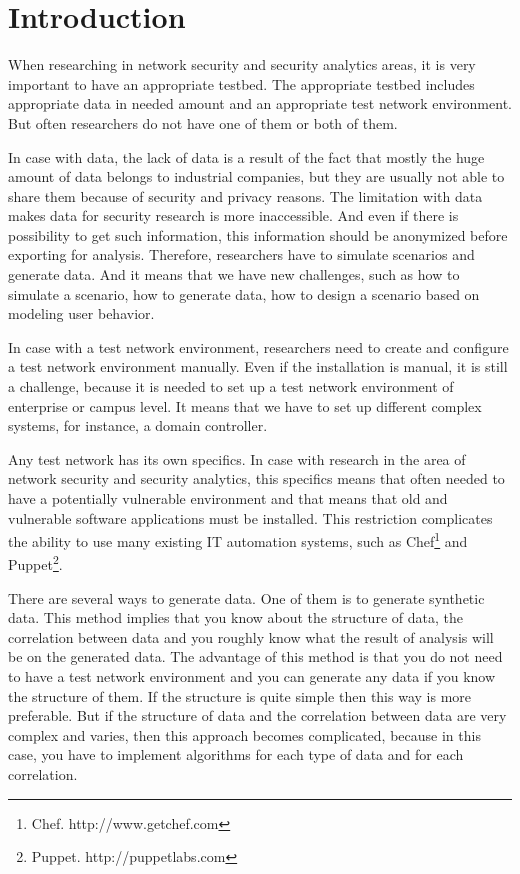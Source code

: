 \section{Introduction}


When researching in network security and security analytics areas, it is very important to have an appropriate testbed. The appropriate testbed includes appropriate data in needed amount and an appropriate test network environment. But often researchers do not have one of them or both of them.  

In case with data, the lack of data is a result of the fact that mostly the huge amount of data belongs to industrial companies, but they are usually not able to share them because of security and privacy reasons. The limitation with data makes data for security research is more inaccessible. And even if there is possibility to get such information, this information should be anonymized before exporting for analysis. Therefore, researchers have to simulate scenarios and generate data. And it means that we have new challenges, such as how to simulate a scenario, how to generate data, how to design a scenario based on modeling user behavior. 

In case with a test network environment, researchers need to create and configure a test network environment manually. Even if the installation is manual, it is still a challenge, because it is needed to set up a test network environment of enterprise or campus level. It means that we have to set up different complex systems, for instance, a domain controller. 

Any test network has its own specifics. In case with research in the area of network security and security analytics, this specifics means that often needed to have a potentially vulnerable environment and that means that old and vulnerable software applications must be installed. This restriction complicates the ability to use many existing IT automation systems, such as Chef\footnote{Chef. http://www.getchef.com} and Puppet\footnote{Puppet. http://puppetlabs.com}. %

There are several ways to generate data. One of them is to generate synthetic data. This method implies that you know about the structure of data, the correlation between data and you roughly know what the result of analysis will be on the generated data. The advantage of this method is that you do not need to have a test network environment and you can generate any data if you know the structure of them. If the structure is quite simple then this way is more preferable. But if the structure of data and the correlation between data are very complex and varies, then this approach becomes complicated, because in this case, you have to implement algorithms for each type of data and for each correlation. 

